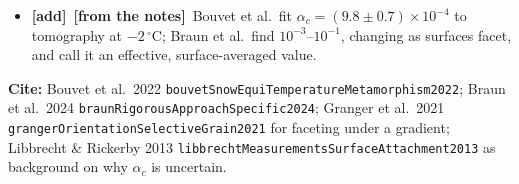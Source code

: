 \documentclass[11pt]{article}
\newcommand{\Note}{\textcolor{open}{\textbf{[from the notes]}}\ }
\newcommand{\Cite}[1]{\par{\footnotesize\raggedright\textcolor{have}{\textbf{Cite:}} #1\par}}
\newcommand{\tA}{\textcolor{have}{\textbf{[add]}}\ }
\begin{document}
\begin{enumerate}
\begin{itemize}
    one-equation neck model), while the sharp-interface exponent at
    saturation falls with it (0.29 at $10^{-3}$, 0.25 at $10^{-2}$, 0.18
    at 0.1). One value cannot serve both.
  \item \tA \Note Bouvet et al.\ fit $\alpha_c = (9.8 \pm 0.7)\times10^{-4}$
    to tomography at $-2\,^{\circ}$C; Braun et al.\ find
    $10^{-3}$--$10^{-1}$, changing as surfaces facet, and call it an
    effective, surface-averaged value.
  \end{itemize}
  \Cite{Bouvet et al.\ 2022 \texttt{bouvetSnowEquiTemperatureMetamorphism2022}; Braun et al.\ 2024 \texttt{braunRigorousApproachSpecific2024}; Granger et al.\ 2021 \texttt{grangerOrientationSelectiveGrain2021} for faceting under a gradient; Libbrecht \& Rickerby 2013 \texttt{libbrechtMeasurements\allowbreak SurfaceAttachment2013} as background on why $\alpha_c$ is uncertain.}
\end{enumerate}
\end{document}

